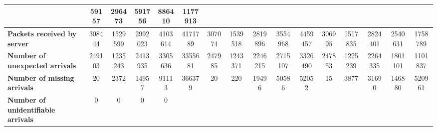 \begin{table}[!h]
{\begin{tabular}{|l|ccccc|ccccc|ccccc|}
            & \multicolumn{1}{c|}{59157}
            & \multicolumn{1}{c|}{296473}
            & \multicolumn{1}{c|}{591756}
            & \multicolumn{1}{c|}{886410}
            & \multicolumn{1}{c|}{1177913}
            \\ \hline
            \textbf{Packets received by server} & \multicolumn{1}{c|}{308444} & \multicolumn{1}{c|}{1529599}
            & \multicolumn{1}{c|}{2992023}
            & \multicolumn{1}{c|}{4103614}
            & \multicolumn{1}{c|}{4171789}
            & \multicolumn{1}{c|}{307074}
            & \multicolumn{1}{c|}{1539518}
            & \multicolumn{1}{c|}{2819896}
            & \multicolumn{1}{c|}{3554968}
            & \multicolumn{1}{c|}{4459457}
            & \multicolumn{1}{c|}{306995}
            & \multicolumn{1}{c|}{1517835}
            & \multicolumn{1}{c|}{2824401}
            & \multicolumn{1}{c|}{2540631}
            & \multicolumn{1}{c|}{1758789}
            \\ \hline
            \textbf{Number of unexpected arrivals} & \multicolumn{1}{c|}{249103} & \multicolumn{1}{c|}{1235243}
            & \multicolumn{1}{c|}{2413935}
            & \multicolumn{1}{c|}{3305636}
            & \multicolumn{1}{c|}{3355681}
            & \multicolumn{1}{c|}{247985}
            & \multicolumn{1}{c|}{1243371}
            & \multicolumn{1}{c|}{2246215}
            & \multicolumn{1}{c|}{2715107}
            & \multicolumn{1}{c|}{3326490}
            & \multicolumn{1}{c|}{247853}
            & \multicolumn{1}{c|}{1225239}
            & \multicolumn{1}{c|}{2264335}
            & \multicolumn{1}{c|}{1801101}
            & \multicolumn{1}{c|}{1101837}
            \\ \hline
            \textbf{Number of missing arrivals} & \multicolumn{1}{c|}{20} & \multicolumn{1}{c|}{2372}
            & \multicolumn{1}{c|}{14957}
            & \multicolumn{1}{c|}{91113}
            & \multicolumn{1}{c|}{366379}
            & \multicolumn{1}{c|}{20}
            & \multicolumn{1}{c|}{220}
            & \multicolumn{1}{c|}{19496}
            & \multicolumn{1}{c|}{50586}
            & \multicolumn{1}{c|}{52052}
            & \multicolumn{1}{c|}{15}
            & \multicolumn{1}{c|}{3877}
            & \multicolumn{1}{c|}{31690}
            & \multicolumn{1}{c|}{146880}
            & \multicolumn{1}{c|}{520961}
            \\ \hline
            \textbf{Number of unidentifiable arrivals} & \multicolumn{1}{c|}{0} & \multicolumn{1}{c|}{0}
            & \multicolumn{1}{c|}{0}
            & \multicolumn{1}{c|}{0}

\end{tabular}}
\end{table}
